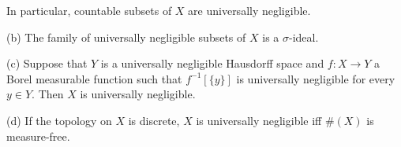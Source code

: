 
\noindent In particular, countable subsets of $X$ are universally
negligible.

(b) The family of universally
negligible subsets of $X$ is a $\sigma$-ideal.

(c) Suppose that $Y$ is a universally
negligible Hausdorff space and $f:X\to Y$ a Borel measurable function
such that $f^{-1}[\{y\}]$ is universally negligible for every $y\in Y$.
Then $X$ is universally negligible.

(d) If the topology on $X$ is discrete, $X$ is universally negligible
iff $\#(X)$ is measure-free.


